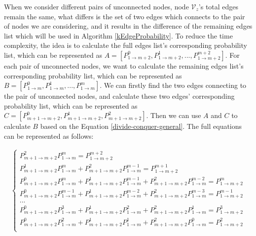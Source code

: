 \documentclass[\main/thesis.tex]{subfiles}
\begin{document}
When we consider different pairs of unconnected nodes, node $\mathcal{V}_z$'s total edges remain the same, what differs is the set of two edges which connects to the pair of nodes we are considering, and it results in the difference of the remaining edges list which will be used in Algorithm \ref{kEdgeProbability}. To reduce the time complexity, the idea is to calculate the full edges list's corresponding probability list, which can be represented as $A = [P_{1\rightarrow m+2}^0, P_{1\rightarrow m+2}^1, ..., P_{1\rightarrow m+2}^{m+2}]$. For each pair of unconnected nodes, we want to calculate the remaining edges list's corresponding probability list, which can be represented as $B = [P_{1\rightarrow m}^0, P_{1\rightarrow m}^1, ..., P_{1\rightarrow m}^{m}]$. We can firstly find the two edges connecting to the pair of unconnected nodes, and calculate these two edges' corresponding probability list, which can be represented as $C = [P_{m+1\rightarrow m+2}^0, P_{m+1\rightarrow m+2}^1, P_{m+1\rightarrow m+2}^2]$. Then we can use $A$ and $C$ to calculate $B$ based on the Equation \ref{divide-conquer-general}. The full equations can be represented as follows:

\begin{align*}
\left\{
\begin{aligned}
P_{m+1\rightarrow m+2}^2 P_{1\rightarrow m}^{m} = P_{1\rightarrow m+2}^{m+2}\\
P_{m+1\rightarrow m+2}^1 P_{1\rightarrow m}^{m} + P_{m+1\rightarrow m+2}^2 P_{1\rightarrow m}^{m-1} = P_{1\rightarrow m+2}^{m+1}\\
P_{m+1\rightarrow m+2}^0 P_{1\rightarrow m}^{m} + P_{m+1\rightarrow m+2}^1 P_{1\rightarrow m}^{m-1} + P_{m+1\rightarrow m+2}^2 P_{1\rightarrow m}^{m-2} = P_{1\rightarrow m+2}^{m}\\
P_{m+1\rightarrow m+2}^0 P_{1\rightarrow m}^{m-1} + P_{m+1\rightarrow m+2}^1 P_{1\rightarrow m}^{m-2} + P_{m+1\rightarrow m+2}^2 P_{1\rightarrow m}^{m-3} = P_{1\rightarrow m+2}^{m-1}\\
...\\
P_{m+1\rightarrow m+2}^0 P_{1\rightarrow m}^{3} + P_{m+1\rightarrow m+2}^1 P_{1\rightarrow m}^{2} + P_{m+1\rightarrow m+2}^2 P_{1\rightarrow m}^{1} = P_{1\rightarrow m+2}^3\\
P_{m+1\rightarrow m+2}^0 P_{1\rightarrow m}^{2} + P_{m+1\rightarrow m+2}^1 P_{1\rightarrow m}^{1} + P_{m+1\rightarrow m+2}^2 P_{1\rightarrow m}^{0} = P_{1\rightarrow m+2}^2\\
\end{aligned}
\right.
\end{align*}
\end{document}
